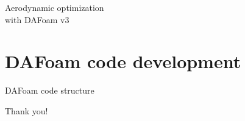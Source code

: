 \documentclass{bredelebeamer}
\begin{document}
\begin{frame}{}
  \center \Large Aerodynamic optimization \\ with DAFoam v3
\end{frame}

\section{DAFoam code development}
\renewcommand{\arraystretch}{2}

\begin{frame}{}
  \center \Large DAFoam code structure
\end{frame}

\begin{frame}[plain]{}
  \Huge \centering
  Thank you!
\end{frame}
\end{document}
